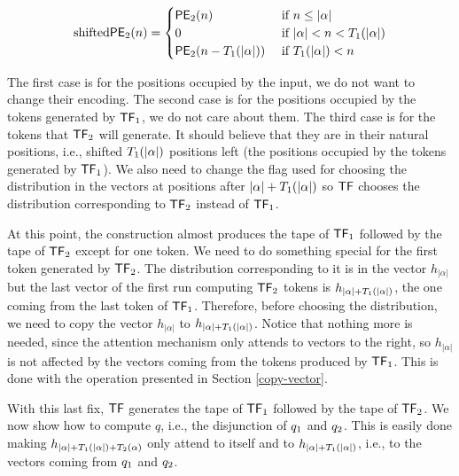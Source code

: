 \[
\text{shifted}{\mathsf{PE}}_2(n) = \begin{cases}
        {\mathsf{PE}}_2(n)                          &\text{ if } n \leq |\alpha|             \\
        0                                       &\text{ if } |\alpha| < n < {T}_1(|\alpha|) \\
        {\mathsf{PE}}_2(n - {T}_1(|\alpha|))    &\text{ if } {T}_1(|\alpha|) < n                   \\
    \end{cases}
\]

The first case is for the positions occupied by the input, we do not want to change their encoding.
The second case is for the positions occupied by the tokens generated by ${\mathsf{TF}}_1$, we do not care about them.
The third case is for the tokens that ${\mathsf{TF}}_2$ will generate.
It should believe that they are in their natural positions, i.e., shifted ${T}_1(|\alpha|)$ positions left (the positions occupied by the tokens generated by ${\mathsf{TF}}_1$).
We also need to change the flag used for choosing the distribution in the vectors at positions after $|\alpha| + {T}_1(|\alpha|)$ so $\mathsf{TF}$ chooses the distribution corresponding to ${\mathsf{TF}}_2$ instead of ${\mathsf{TF}}_1$.

At this point, the construction almost produces the tape of ${\mathsf{TF}}_1$ followed by the tape of ${\mathsf{TF}}_2$ except for one token.
We need to do something special for the first token generated by ${\mathsf{TF}}_2$.
The distribution corresponding to it is in the vector $h_{|\alpha|}$ but the last vector of the first run computing ${\mathsf{TF}}_2$ tokens is $h_{|\alpha| + {T}_1(|\alpha|)}$, the one coming from the last token of ${\mathsf{TF}}_1$.
Therefore, before choosing the distribution, we need to copy the vector $h_{|\alpha|}$ to $h_{|\alpha| + {T}_1(|\alpha|)}$.
Notice that nothing more is needed, since the attention mechanism only attends to vectors to the right, so $h_{|\alpha|}$ is not affected by the vectors coming from the tokens produced by ${\mathsf{TF}}_1$.
This is done with the operation presented in Section \ref{copy-vector}.

With this last fix, $\mathsf{TF}$ generates the tape of ${\mathsf{TF}}_1$ followed by the tape of ${\mathsf{TF}}_2$.
We now show how to compute $q$, i.e., the disjunction of ${q}_1$ and ${q}_2$.
This is easily done making $h_{|\alpha| + {T}_1(|\alpha|) + {T}_2(\alpha)}$ only attend to itself and to $h_{|\alpha| + {T}_1(|\alpha|)}$, i.e., to the vectors coming from ${q}_1$ and ${q}_2$.


